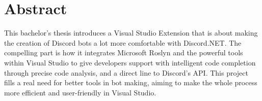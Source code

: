 \section{Abstract}
This bachelor's thesis introduces a Visual Studio Extension that is about making the creation of Discord bots a lot more comfortable with Discord.NET. The compelling part is how it integrates Microsoft Roslyn and the powerful tools within Visual Studio to give developers support with intelligent code completion through precise code analysis, and a direct line to Discord's API. This project fills a real need for better tools in bot making, aiming to make the whole process more efficient and user-friendly in Visual Studio.